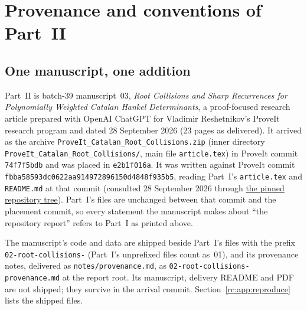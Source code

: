 \documentclass[11pt,a4paper]{article}
\numberwithin{equation}{section}
\theoremstyle{definition}
\theoremstyle{remark}
\begin{document}
\section{Provenance and conventions of Part~II}\label{rc:sec:intro}

\subsection{One manuscript, one addition}\label{rc:sec:source}
Part~II is batch-39 manuscript~03, \emph{Root Collisions and Sharp
Recurrences for Polynomially Weighted Catalan Hankel Determinants}, a
proof-focused research article prepared with OpenAI ChatGPT for Vladimir
Reshetnikov's ProveIt research program and dated 28 September 2026
(23 pages as delivered).  It arrived as the archive
\nolinkurl{ProveIt_Catalan_Root_Collisions.zip} (inner directory
\nolinkurl{ProveIt_Catalan_Root_Collisions/}, main file
\nolinkurl{article.tex}) in ProveIt commit \texttt{74f7f5bdb} and was
placed in \texttt{e2b1f016a}.  It was written against ProveIt commit
\texttt{fbba58593dc0622aa914972896150d4848f935b5}, reading Part~I's
\nolinkurl{article.tex} and \nolinkurl{README.md} at that commit
(consulted 28 September 2026 through
\href{https://github.com/VladimirReshetnikov/ProveIt/tree/fbba58593dc0622aa914972896150d4848f935b5/SetTheory/Cardinals/docs/reports/hankel-determinants/catalan-and-ballot/shifted-catalan-hankel-polynomials}{the
pinned repository tree}).  Part~I's files are unchanged between that
commit and the placement commit, so every statement the manuscript makes
about ``the repository report'' refers to Part~I as printed above.

The manuscript's code and data are shipped beside Part~I's files with the
prefix \texttt{02-root-collisions-} (Part~I's unprefixed files count
as~01), and its provenance notes, delivered as
\nolinkurl{notes/provenance.md}, as
\nolinkurl{02-root-collisions-provenance.md} at the report root.  Its
manuscript, delivery README and PDF are not shipped; they survive in the
arrival commit.  Section~\ref{rc:app:reproduce} lists the shipped files.
\end{document}
